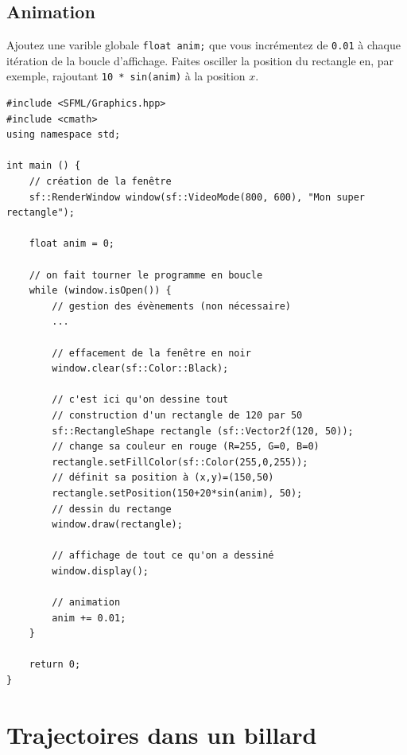 \documentclass{book}
\newcommand{\inline}[1]{\texttt{#1}}
\begin{document}
\subsection{Animation}

Ajoutez une varible globale \inline{float anim;} que vous incrémentez de \inline{0.01} à chaque itération de la boucle d'affichage. Faites osciller la position du rectangle en, par exemple, rajoutant \inline{10 * sin(anim)} à la position $x$.

\begin{correction}
\begin{verbatim}
#include <SFML/Graphics.hpp>
#include <cmath>
using namespace std;

int main () {
    // création de la fenêtre
    sf::RenderWindow window(sf::VideoMode(800, 600), "Mon super rectangle");

    float anim = 0;

    // on fait tourner le programme en boucle
    while (window.isOpen()) {
        // gestion des évènements (non nécessaire)
        ...

        // effacement de la fenêtre en noir
        window.clear(sf::Color::Black);

        // c'est ici qu'on dessine tout
        // construction d'un rectangle de 120 par 50
        sf::RectangleShape rectangle (sf::Vector2f(120, 50));
        // change sa couleur en rouge (R=255, G=0, B=0)
        rectangle.setFillColor(sf::Color(255,0,255));
        // définit sa position à (x,y)=(150,50)
        rectangle.setPosition(150+20*sin(anim), 50);
        // dessin du rectange
        window.draw(rectangle);

        // affichage de tout ce qu'on a dessiné
        window.display();

        // animation
        anim += 0.01;
    }

    return 0;
}
\end{verbatim}
\end{correction}

\newpage

\section{Trajectoires dans un billard}
\end{document}
